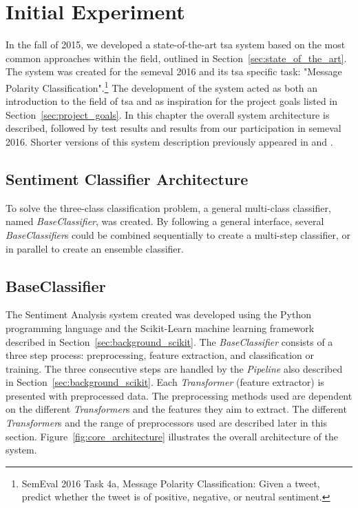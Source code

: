 \chapter{Initial Experiment}
\label{ch:initial_experiment}
In the fall of 2015, we developed a state-of-the-art \ac{tsa} system based on the most common approaches within the field, outlined in Section~\ref{sec:state_of_the_art}. The system was created for the \ac{semeval} 2016 and its \ac{tsa} specific task: "Message Polarity Classification".\footnote{SemEval 2016 Task 4a, Message Polarity Classification: Given a tweet, predict whether the tweet is of positive, negative, or neutral sentiment.} The development of the system acted as both an introduction to the field of \ac{tsa} and as inspiration for the project goals listed in Section~\ref{sec:project_goals}. In this chapter the overall system architecture is described, followed by test results and results from our participation in \ac{semeval} 2016. Shorter versions of this system description previously appeared in \cite{JahFre16} and \cite{JahFre15}.

\section{Sentiment Classifier Architecture}
To solve the three-class classification problem, a general multi-class classifier, named \textit{BaseClassifier}, was created. By following a general interface, several \textit{BaseClassifier}s could be combined sequentially to create a multi-step classifier, or in parallel to create an ensemble classifier.


\section{BaseClassifier}
\label{sec:core_architecture}
The Sentiment Analysis system created was developed using the Python programming language and the Scikit-Learn machine learning framework described in Section~\ref{sec:background_scikit}. The \textit{BaseClassifier} consists of a three step process: preprocessing, feature extraction, and classification or training. The three consecutive steps are handled by the \textit{Pipeline} also described in Section~\ref{sec:background_scikit}. Each \textit{Transformer} (feature extractor) is presented with preprocessed data. The preprocessing methods used are dependent on the different \textit{Transformer}s and the features they aim to extract. The different \textit{Transformer}s and the range of preprocessors used are described later in this section. Figure~\ref{fig:core_architecture} illustrates the overall architecture of the system. \\

